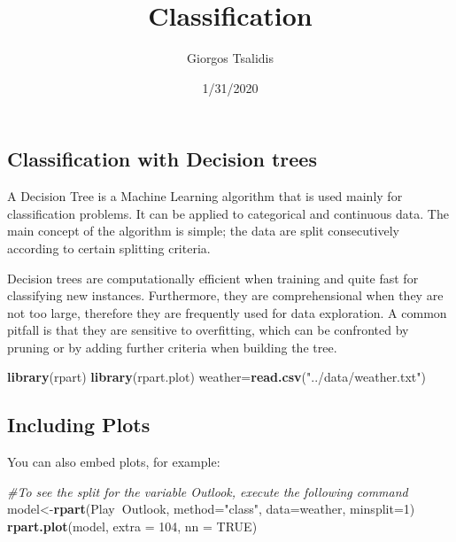 \documentclass[]{article}
\title{Classification}
\author{Giorgos Tsalidis}
\date{1/31/2020}
\newenvironment{Shaded}{\begin{snugshade}}{\end{snugshade}}
\newcommand{\CommentTok}[1]{\textcolor[rgb]{0.56,0.35,0.01}{\textit{#1}}}
\newcommand{\DataTypeTok}[1]{\textcolor[rgb]{0.13,0.29,0.53}{#1}}
\newcommand{\DecValTok}[1]{\textcolor[rgb]{0.00,0.00,0.81}{#1}}
\newcommand{\KeywordTok}[1]{\textcolor[rgb]{0.13,0.29,0.53}{\textbf{#1}}}
\newcommand{\NormalTok}[1]{#1}
\newcommand{\OperatorTok}[1]{\textcolor[rgb]{0.81,0.36,0.00}{\textbf{#1}}}
\newcommand{\OtherTok}[1]{\textcolor[rgb]{0.56,0.35,0.01}{#1}}
\newcommand{\StringTok}[1]{\textcolor[rgb]{0.31,0.60,0.02}{#1}}
\begin{document}
\maketitle

\hypertarget{classification-with-decision-trees}{%
\subsection{Classification with Decision
trees}\label{classification-with-decision-trees}}

A Decision Tree is a Machine Learning algorithm that is used mainly for
classification problems. It can be applied to categorical and continuous
data. The main concept of the algorithm is simple; the data are split
consecutively according to certain splitting criteria.

Decision trees are computationally efficient when training and quite
fast for classifying new instances. Furthermore, they are
comprehensional when they are not too large, therefore they are
frequently used for data exploration. A common pitfall is that they are
sensitive to overfitting, which can be confronted by pruning or by
adding further criteria when building the tree.

\begin{Shaded}
\begin{Highlighting}[]
\KeywordTok{library}\NormalTok{(rpart)}
\KeywordTok{library}\NormalTok{(rpart.plot)}
\NormalTok{weather=}\KeywordTok{read.csv}\NormalTok{(}\StringTok{"../data/weather.txt"}\NormalTok{)}
\end{Highlighting}
\end{Shaded}

\hypertarget{including-plots}{%
\subsection{Including Plots}\label{including-plots}}

You can also embed plots, for example:

\begin{Shaded}
\begin{Highlighting}[]
\CommentTok{#To see the split for the variable Outlook, execute the following command}
\NormalTok{model<-}\KeywordTok{rpart}\NormalTok{(Play}\OperatorTok{~}\NormalTok{Outlook, }\DataTypeTok{method=}\StringTok{"class"}\NormalTok{, }\DataTypeTok{data=}\NormalTok{weather, }\DataTypeTok{minsplit=}\DecValTok{1}\NormalTok{)}
\KeywordTok{rpart.plot}\NormalTok{(model, }\DataTypeTok{extra =} \DecValTok{104}\NormalTok{, }\DataTypeTok{nn =} \OtherTok{TRUE}\NormalTok{)}
\end{Highlighting}
\end{Shaded}
\end{document}
